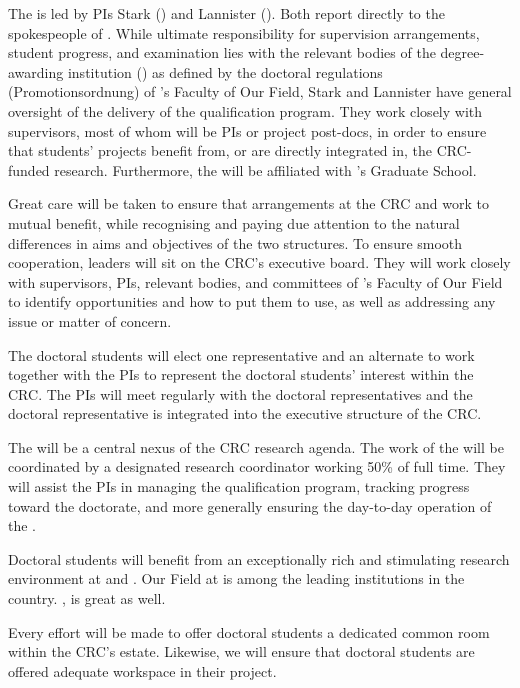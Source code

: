 
The  is led by PIs Stark (\ABRB{}) and Lannister (\ABRA{}). Both report directly to the spokespeople of \thiscrc. While ultimate responsibility for supervision arrangements, student progress, and examination lies with the relevant bodies of the degree-awarding institution (\ABRA{}) as defined by the doctoral regulations (Promotionsordnung) of \ABRA{}’s Faculty of Our Field, Stark and Lannister have general oversight of the delivery of the qualification program. They work closely with supervisors, most of whom will be PIs or project post-docs, in order to ensure that students’ projects benefit from, or are directly integrated in, the CRC-funded research. Furthermore, the  will be affiliated with \ABRA{}'s Graduate School.

Great care will be taken to ensure that arrangements at the CRC and  work to mutual benefit, while recognising and paying due attention to  the natural differences in aims and objectives of the two structures. To ensure smooth cooperation,  leaders will sit on the CRC’s executive board. They will work closely with supervisors, PIs, relevant bodies, and committees of \ABRA{}’s Faculty of Our Field to identify opportunities and how to put them to use, as well as addressing any issue or matter of concern.

The doctoral students will elect one representative and an alternate to work together with the PIs to represent the doctoral students' interest within the CRC.  The PIs will meet regularly with the doctoral representatives and the doctoral representative is integrated into the executive structure of the CRC.

The  will be a central nexus of the CRC research agenda.  The work of the  will be coordinated by a designated research coordinator working 50\% of full time.  They will assist the PIs in managing the qualification program, tracking progress toward the doctorate, and more generally ensuring the day-to-day operation of the .


Doctoral students will benefit from an exceptionally rich and
stimulating research environment at \ABRA{} and \ABRB{}. Our Field at
\ABRA{} is among the leading institutions in the country. \ABRB{}, is
great as well.

Every effort will be made to offer doctoral students a dedicated
common room within the CRC’s estate. Likewise, we will ensure that
doctoral students are offered adequate workspace in their project.

